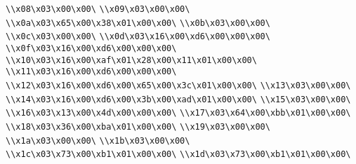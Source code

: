 \verb|\\x08\x03\x00\x00\|\newline
\verb|\\x09\x03\x00\x00\|\newline
\verb|\\x0a\x03\x65\x00\x38\x01\x00\x00\|\newline
\verb|\\x0b\x03\x00\x00\|\newline
\verb|\\x0c\x03\x00\x00\|\newline
\verb|\\x0d\x03\x16\x00\xd6\x00\x00\x00\|\newline
\verb|\\x0f\x03\x16\x00\xd6\x00\x00\x00\|\newline
\verb|\\x10\x03\x16\x00\xaf\x01\x28\x00\x11\x01\x00\x00\|\newline
\verb|\\x11\x03\x16\x00\xd6\x00\x00\x00\|\newline
\verb|\\x12\x03\x16\x00\xd6\x00\x65\x00\x3c\x01\x00\x00\|\newline
\verb|\\x13\x03\x00\x00\|\newline
\verb|\\x14\x03\x16\x00\xd6\x00\x3b\x00\xad\x01\x00\x00\|\newline
\verb|\\x15\x03\x00\x00\|\newline
\verb|\\x16\x03\x13\x00\x4d\x00\x00\x00\|\newline
\verb|\\x17\x03\x64\x00\xbb\x01\x00\x00\|\newline
\verb|\\x18\x03\x36\x00\xba\x01\x00\x00\|\newline
\verb|\\x19\x03\x00\x00\|\newline
\verb|\\x1a\x03\x00\x00\|\newline
\verb|\\x1b\x03\x00\x00\|\newline
\verb|\\x1c\x03\x73\x00\xb1\x01\x00\x00\|\newline
\verb|\\x1d\x03\x73\x00\xb1\x01\x00\x00\|\newline

